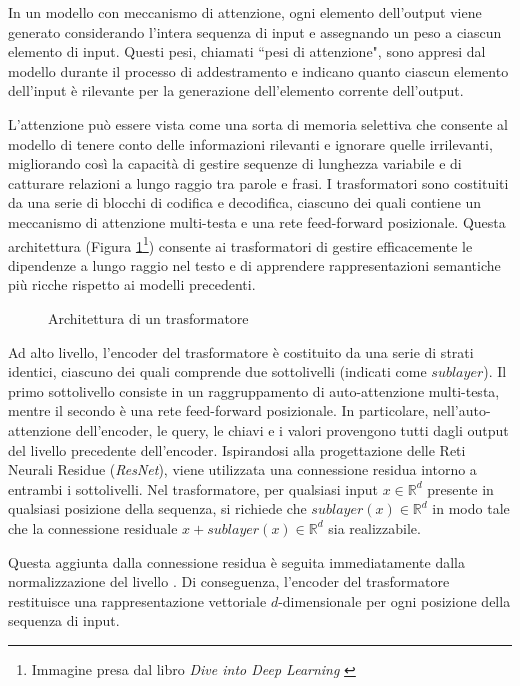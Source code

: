In un modello con meccanismo di attenzione, ogni elemento dell'output viene generato considerando l'intera sequenza di input e assegnando un peso a ciascun elemento di input. Questi pesi, chiamati ``pesi di attenzione", sono appresi dal modello durante il processo di addestramento e indicano quanto ciascun elemento dell'input è rilevante per la generazione dell'elemento corrente dell'output.

L'attenzione può essere vista come una sorta di memoria selettiva che consente al modello di tenere conto delle informazioni rilevanti e ignorare quelle irrilevanti, migliorando così la capacità di gestire sequenze di lunghezza variabile e di catturare relazioni a lungo raggio tra parole e frasi.
I trasformatori sono costituiti da una serie di blocchi di codifica e decodifica, ciascuno dei quali contiene un meccanismo di attenzione multi-testa e una rete feed-forward posizionale. Questa architettura (Figura \ref{fig:transformer}\footnote{Immagine presa dal libro \emph{Dive into Deep Learning} \cite{d2l-book-transformer}}) consente ai trasformatori di gestire efficacemente le dipendenze a lungo raggio nel testo e di apprendere rappresentazioni semantiche più ricche rispetto ai modelli precedenti.
\begin{figure}[ht]
	\centering
	
	\caption{Architettura di un trasformatore}
	\label{fig:transformer}
\end{figure}

Ad alto livello, l'encoder del trasformatore è costituito da una serie di strati identici, ciascuno dei quali comprende due sottolivelli (indicati come \(sublayer\)). Il primo sottolivello consiste in un raggruppamento di auto-attenzione multi-testa, mentre il secondo è una rete feed-forward posizionale. In particolare, nell'auto-attenzione dell'encoder, le query, le chiavi e i valori provengono tutti dagli output del livello precedente dell'encoder. Ispirandosi alla progettazione delle Reti Neurali Residue (\emph{ResNet}), viene utilizzata una connessione residua intorno a entrambi i sottolivelli. Nel trasformatore, per qualsiasi input $x \in \mathbb{R}^d$ presente in qualsiasi posizione della sequenza, si richiede che $sublayer(x) \in \mathbb{R}^d$ in modo tale che la connessione residuale $x + sublayer(x) \in \mathbb{R}^d$ sia realizzabile.

Questa aggiunta dalla connessione residua è seguita immediatamente dalla normalizzazione del livello \cite{DBLP:journals/corr/BaKH16}. Di conseguenza, l'encoder del trasformatore restituisce una rappresentazione vettoriale $d$-dimensionale per ogni posizione della sequenza di input.

